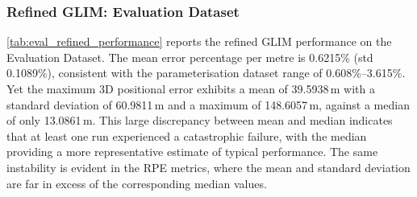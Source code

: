 \subsubsection{Refined GLIM: Evaluation Dataset}

\cref{tab:eval_refined_performance} reports the refined GLIM performance on the Evaluation Dataset. The mean error percentage per metre is 0.6215\% (std 0.1089\%), consistent with the parameterisation dataset range of 0.608\%--3.615\%. Yet the maximum 3D positional error exhibits a mean of 39.5938\,m with a standard deviation of 60.9811\,m and a maximum of 148.6057\,m, against a median of only 13.0861\,m. This large discrepancy between mean and median indicates that at least one run experienced a catastrophic failure, with the median providing a more representative estimate of typical performance. The same instability is evident in the RPE metrics, where the mean and standard deviation are far in excess of the corresponding median values.

